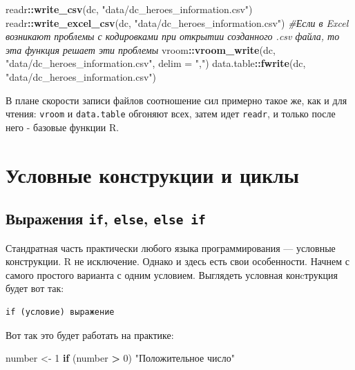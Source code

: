 \documentclass[
]{book}
\newenvironment{Shaded}{\begin{snugshade}}{\end{snugshade}}
\newcommand{\CommentTok}[1]{\textcolor[rgb]{0.56,0.35,0.01}{\textit{#1}}}
\newcommand{\ControlFlowTok}[1]{\textcolor[rgb]{0.13,0.29,0.53}{\textbf{#1}}}
\newcommand{\DataTypeTok}[1]{\textcolor[rgb]{0.13,0.29,0.53}{#1}}
\newcommand{\DecValTok}[1]{\textcolor[rgb]{0.00,0.00,0.81}{#1}}
\newcommand{\KeywordTok}[1]{\textcolor[rgb]{0.13,0.29,0.53}{\textbf{#1}}}
\newcommand{\NormalTok}[1]{#1}
\newcommand{\OperatorTok}[1]{\textcolor[rgb]{0.81,0.36,0.00}{\textbf{#1}}}
\newcommand{\StringTok}[1]{\textcolor[rgb]{0.31,0.60,0.02}{#1}}
\begin{document}
\begin{Shaded}
\begin{Highlighting}[]
\NormalTok{readr}\OperatorTok{::}\KeywordTok{write_csv}\NormalTok{(dc, }\StringTok{"data/dc_heroes_information.csv"}\NormalTok{)}
\NormalTok{readr}\OperatorTok{::}\KeywordTok{write_excel_csv}\NormalTok{(dc, }\StringTok{"data/dc_heroes_information.csv"}\NormalTok{) }\CommentTok{#Если в Excel возникают проблемы с кодировками при открытии созданного .csv файла, то эта функция решает эти проблемы}
\NormalTok{vroom}\OperatorTok{::}\KeywordTok{vroom_write}\NormalTok{(dc, }\StringTok{"data/dc_heroes_information.csv"}\NormalTok{, }\DataTypeTok{delim =} \StringTok{","}\NormalTok{)}
\NormalTok{data.table}\OperatorTok{::}\KeywordTok{fwrite}\NormalTok{(dc, }\StringTok{"data/dc_heroes_information.csv"}\NormalTok{)}
\end{Highlighting}
\end{Shaded}

В плане скорости записи файлов соотношение сил примерно такое же, как и для чтения: \texttt{vroom} и \texttt{data.table} обгоняют всех, затем идет \texttt{readr}, и только после него - базовые функции R.

\hypertarget{loops_conditions}{%
\chapter{Условные конструкции и циклы}\label{loops_conditions}}

\hypertarget{if}{%
\section{\texorpdfstring{Выражения \texttt{if}, \texttt{else}, \texttt{else\ if}}{Выражения if, else, else if}}\label{if}}

Стандратная часть практически любого языка программирования --- условные конструкции. R не исключение. Однако и здесь есть свои особенности. Начнем с самого простого варианта с одним условием. Выглядеть условная конcтрукция будет вот так:

\begin{verbatim}
if (условие) выражение
\end{verbatim}

Вот так это будет работать на практике:

\begin{Shaded}
\begin{Highlighting}[]
\NormalTok{number <-}\StringTok{ }\DecValTok{1}
\ControlFlowTok{if}\NormalTok{ (number }\OperatorTok{>}\StringTok{ }\DecValTok{0}\NormalTok{) }\StringTok{"Положительное число"}
\end{Highlighting}
\end{Shaded}
\end{document}
